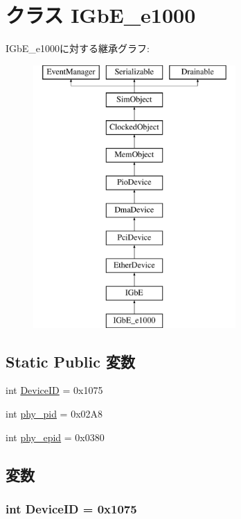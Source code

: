 \hypertarget{classEthernet_1_1IGbE__e1000}{
\section{クラス IGbE\_\-e1000}
\label{classEthernet_1_1IGbE__e1000}
}
IGbE\_\-e1000に対する継承グラフ:\begin{figure}[H]
\begin{center}
\leavevmode
\includegraphics[height=10cm]{classEthernet_1_1IGbE__e1000}
\end{center}
\end{figure}
\subsection*{Static Public 変数}
\begin{DoxyCompactItemize}
\item 
int \hyperlink{classEthernet_1_1IGbE__e1000_a4a8ed9a0233fc6d0ce178569c4de25d0}{DeviceID} = 0x1075
\item 
int \hyperlink{classEthernet_1_1IGbE__e1000_a229cca8e73c20d1d9c9089d20967f7fa}{phy\_\-pid} = 0x02A8
\item 
int \hyperlink{classEthernet_1_1IGbE__e1000_a5bb971e985d09a29903843736a36c7d8}{phy\_\-epid} = 0x0380
\end{DoxyCompactItemize}


\subsection{変数}
\hypertarget{classEthernet_1_1IGbE__e1000_a4a8ed9a0233fc6d0ce178569c4de25d0}{
\subsubsection[{DeviceID}]{\setlength{\rightskip}{0pt plus 5cm}int {\bf DeviceID} = 0x1075}}
\label{classEthernet_1_1IGbE__e1000_a4a8ed9a0233fc6d0ce178569c4de25d0}



